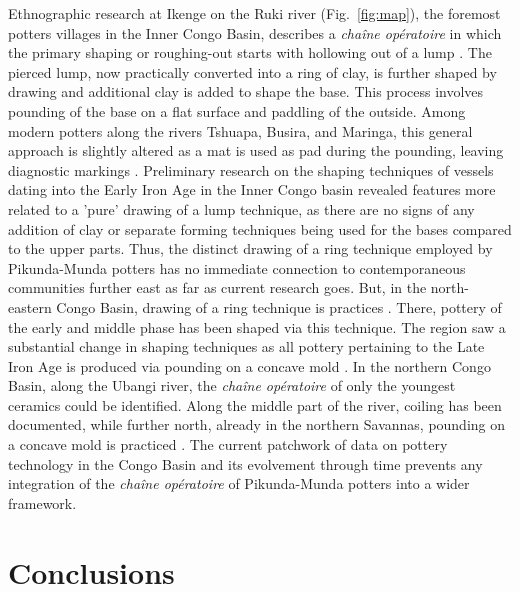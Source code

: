 \documentclass[smallextended,natbib]{svjour3}       %
\begin{document}
Ethnographic research at Ikenge on the Ruki river (Fig.~\ref{fig:map}), the foremost potters villages in the Inner Congo Basin, describes a \textit{chaîne opératoire} in which the primary shaping or roughing-out starts with hollowing out of a lump \citep{Eggert.1980c}. The pierced lump, now practically converted into a ring of clay, is further shaped by drawing and additional clay is added to shape the base. This process involves pounding of the base on a flat surface and paddling of the outside. Among modern potters along the rivers Tshuapa, Busira, and Maringa, this general approach is slightly altered as a mat is used as pad during the pounding, leaving diagnostic markings \citep[188,196--197]{Wotzka.1995}. Preliminary research on the shaping techniques of vessels dating into the Early Iron Age in the Inner Congo basin revealed features more related to a 'pure' drawing of a lump technique, as there are no signs of any addition of clay or separate forming techniques being used for the bases compared to the upper parts. Thus, the distinct drawing of a ring technique employed by Pikunda-Munda potters has no immediate connection to contemporaneous communities further east as far as current research goes. But, in the north-eastern Congo Basin, drawing of a ring technique is practices \citep[110,115]{LivingstoneSmith.2017}. There, pottery of the early and middle phase has been shaped via this technique. The region saw a substantial change in shaping techniques as all pottery pertaining to the Late Iron Age is produced via pounding on a concave mold \citep[111,115]{LivingstoneSmith.2017}. In the northern Congo Basin, along the Ubangi river, the \textit{chaîne opératoire} of only the youngest ceramics could be identified. Along the middle part of the river, coiling has been documented, while further north, already in the northern Savannas, pounding on a concave mold is practiced \citep[55--60 Fig.~19--20,73]{Seidensticker.2021e}. The current patchwork of data on pottery technology in the Congo Basin and its evolvement through time prevents any integration of the \textit{chaîne opératoire} of Pikunda-Munda potters into a wider framework.


\section{Conclusions}
\end{document}
